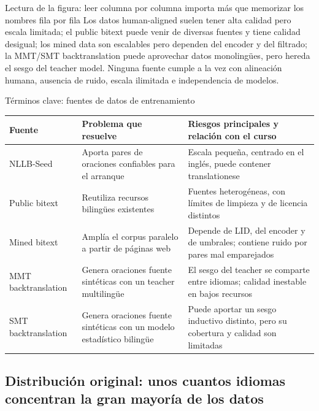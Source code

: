 
\begin{knowledgebox}{Lectura de la figura: leer columna por columna importa más que memorizar los nombres fila por fila}
Los datos human-aligned suelen tener alta calidad pero escala limitada; el public bitext puede venir de diversas fuentes y tiene calidad desigual; los mined data son escalables pero dependen del encoder y del filtrado; la MMT/SMT backtranslation puede aprovechar datos monolingües, pero hereda el sesgo del teacher model. Ninguna fuente cumple a la vez con alineación humana, ausencia de ruido, escala ilimitada e independencia de modelos.
\end{knowledgebox}

\begin{knowledgebox}{Términos clave: fuentes de datos de entrenamiento}
\begin{tabularx}{\textwidth}{@{}L{0.19\textwidth}L{0.25\textwidth}X@{}}
\toprule
Fuente & Problema que resuelve & Riesgos principales y relación con el curso \\
\midrule
NLLB-Seed & Aporta pares de oraciones confiables para el arranque & Escala pequeña, centrado en el inglés, puede contener translationese \\
Public bitext & Reutiliza recursos bilingües existentes & Fuentes heterogéneas, con límites de limpieza y de licencia distintos \\
Mined bitext & Amplía el corpus paralelo a partir de páginas web & Depende de LID, del encoder y de umbrales; contiene ruido por pares mal emparejados \\
MMT backtranslation & Genera oraciones fuente sintéticas con un teacher multilingüe & El sesgo del teacher se comparte entre idiomas; calidad inestable en bajos recursos \\
SMT backtranslation & Genera oraciones fuente sintéticas con un modelo estadístico bilingüe & Puede aportar un sesgo inductivo distinto, pero su cobertura y calidad son limitadas \\
\bottomrule
\end{tabularx}
\end{knowledgebox}

\subsection{Distribución original: unos cuantos idiomas concentran la gran mayoría de los datos}


